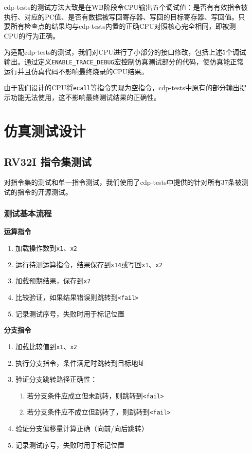 \documentclass[12pt,a4paper]{ctexart}
\newcommand{\code}[1]{\texttt{#1}}
\begin{document}
cdp-tests的测试方法大致是在WB阶段令CPU输出五个调试值：是否有有效指令被执行、对应的PC值、是否有数据被写回寄存器、写回的目标寄存器、写回值。只要所有检查点的结果均与cdp-tests内置的正确CPU对照核心完全相同，即被测CPU的行为正确。

为适配cdp-tests的测试，我们对CPU进行了小部分的接口修改，包括上述5个调试输出。通过定义\code{ENABLE\_TRACE\_DEBUG}宏控制仿真测试部分的代码，使仿真能正常运行并且仿真代码不影响最终烧录的CPU结果。

由于我们设计的CPU将\code{ecall}等指令实现为空指令，cdp-tests中原有的部分输出提示功能无法使用，这不影响最终测试结果的正确性。

\section{仿真测试设计}

\subsection{RV32I 指令集测试}

对指令集的测试和单一指令测试，我们使用了cdp-tests中提供的针对所有37条被测试的指令的开源测试。

\subsubsection{测试基本流程}

\textbf{运算指令}

\begin{enumerate}
    \item 加载操作数到\code{x1}、\code{x2}
    \item 运行待测运算指令，结果保存到\code{x14}或写回\code{x1}、\code{x2}
    \item 加载预期结果，保存到\code{x7}
    \item 比较验证，如果结果错误则跳转到\code{<fail>}
    \item 记录测试序号，失败时用于标记位置
\end{enumerate}

\textbf{分支指令}

\begin{enumerate}
    \item 加载比较值到\code{x1}、\code{x2}
    \item 执行分支指令，条件满足时跳转到目标地址
    \item 验证分支跳转路径正确性：
    \begin{enumerate}
        \item 若分支条件应成立但未跳转，则跳转到\code{<fail>}
        \item 若分支条件应不成立但跳转了，则跳转到\code{<fail>}
    \end{enumerate}
    \item 验证分支偏移量计算正确（向前/向后跳转）
    \item 记录测试序号，失败时用于标记位置
\end{enumerate}
\end{document}
